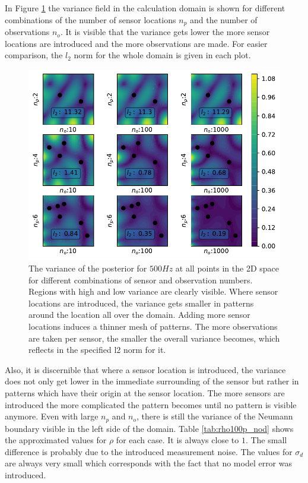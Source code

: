\documentclass[%
  a4paper,oneside,%
  11pt,%
  smallchapters,
  style=printdev,
  extramargin,
  green,%
  rgb, <cmyk>
  ]{tubsbook}
\begin{document}
In Figure \ref{fig:100proc_no_d} the variance field in the calculation domain is shown for different combinations of the number of sensor locations $n_p$ and the number of observations $n_o$. It is visible that the variance gets lower the more sensor locations are introduced and the more observations are made. For easier comparison, the $l_2$ norm for the whole domain is given in each plot.
\begin{figure}[!ht]
\includegraphics[width=.9\textwidth]{../../Python/Results/2D/100procent_no_d/VarField_Posterior.pdf}
\centering
\caption{The variance of the posterior for $500Hz$ at all points in the 2D space for different combinations of sensor and observation numbers. Regions with high and low variance are clearly visible. Where sensor locations are introduced, the variance gets smaller in patterns around the location all over the domain. Adding more sensor locations induces a thinner mesh of patterns. The more observations are taken per sensor, the smaller the overall variance becomes, which reflects in the specified l2 norm for it.}
\label{fig:100proc_no_d}
\end{figure}
Also, it is discernible that where a sensor location is introduced, the variance does not only get lower in the immediate surrounding of the sensor but rather in patterns which have their origin at the sensor location. The more sensors are introduced the more complicated the pattern becomes until no pattern is visible anymore. Even with large $n_p$ and $n_o$, there is still the variance of the Neumann boundary visible in the left side of the domain.
Table \ref{tab:rho100p_nod} shows the approximated values for $\rho$ for each case. It is always close to $1$. The small difference is probably due to the introduced measurement noise. The values for $\sigma_d$ are always very small which corresponds with the fact that no model error was introduced.
\end{document}
